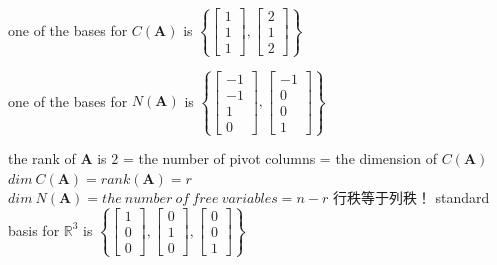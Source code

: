 \documentclass[12pt, a4paper]{article}
\begin{document}
{\par one of the bases for $C({\mathbf{A}})$ is 
\begin{math}
	\left\{
	\begin{bmatrix}
		1 \\
		1 \\
		1 
	\end{bmatrix}
	, 
	\begin{bmatrix}
		2 \\
		1 \\
		2 
	\end{bmatrix}
	\right\}
\end{math}
\par one of the bases for $N({\mathbf{A}})$ is 
\begin{math}
	\left\{
	\begin{bmatrix}
		-1 \\
		-1 \\
		1 \\
		0 
	\end{bmatrix}
	, 
	\begin{bmatrix}
		-1 \\
		0 \\
		0 \\
		1 
	\end{bmatrix}
	\right\}
\end{math}
\par the rank of ${\mathbf{A}}$ is $2$ = the number of pivot columns = the dimension of $C({\mathbf{A}})$
\vspace{14pt}
\newline
{\textcolor{anhao-scarlet}{$dim \ C({\mathbf{A}}) = rank({\mathbf{A}}) = r$}}
\newline
{\textcolor{anhao-scarlet}{$dim \ N({\mathbf{A}}) = the \ number \ of \ free \ variables = n - r$}}
\vspace{14pt}
\newline
{\textcolor{anhao-scarlet}{行秩等于列秩！}}
\vspace{14pt}
\newline
standard basis for $\mathbb{R}^3$ is 
\begin{math}
	\left\{
	\begin{bmatrix}
		1 \\
		0 \\
		0 
	\end{bmatrix}
	, 
	\begin{bmatrix}
		0 \\
		1 \\
		0 
	\end{bmatrix}
	, 
	\begin{bmatrix}
		0 \\
		0 \\
		1 
	\end{bmatrix}
	\right\}
\end{math}

}
\end{document}

